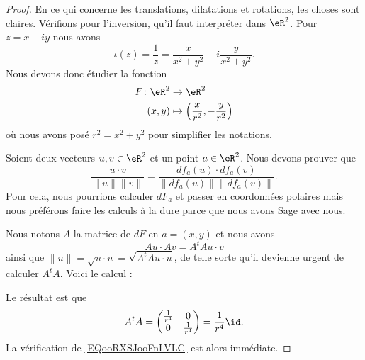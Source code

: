 \begin{proof}
    En ce qui concerne les translations, dilatations et rotations, les choses sont claires. Vérifions pour l'inversion, qu'il faut interpréter dans \( \eR^2\). Pour \( z=x+iy\) nous avons
    \begin{equation}
        \iota(z)=\frac{1}{ z }=\frac{ x }{ x^2+y^2 }-i\frac{ y }{ x^2+y^2 }.
    \end{equation}
    Nous devons donc étudier la fonction
    \begin{equation}
        \begin{aligned}
            F\colon \eR^2&\to \eR^2 \\
            (x,y)&\mapsto \left( \frac{ x }{ r^2 },-\frac{ y }{ r^2 } \right) 
        \end{aligned}
    \end{equation}
    où nous avons posé \( r^2=x^2+y^2\) pour simplifier les notations.

    Soient deux vecteurs \( u,v\in \eR^2\) et un point \( a\in \eR^2\). Nous devons prouver que
    \begin{equation}        \label{EQooRXSJooFnLVLC}
        \frac{ u\cdot v }{ \| u \|\| v \| }=\frac{ df_a(u)\cdot df_a(v)  }{ \| df_a(u) \|\| df_a(v) \| }.
    \end{equation}
    Pour cela, nous pourrions calculer \( dF_a\) et passer en coordonnées polaires\cite{ooDTHEooBAnkGP} mais nous préférons faire les calculs à la dure parce que nous avons Sage avec nous.

    Nous notons \( A\) la matrice de \( dF\) en \( a=(x,y)\) et nous avons
    \begin{equation}
        Au\cdot Av=A^tAu\cdot v
    \end{equation}
    ainsi que \( \| u \|=\sqrt{ u\cdot u }=\sqrt{ A^tAu\cdot u }\), de telle sorte qu'il devienne urgent de calculer \( A^tA\). Voici le calcul :

    

    Le résultat est que
    \begin{equation}
        A^tA=\begin{pmatrix}
            \frac{1}{ r^4 }    &   0    \\ 
            0    &   \frac{1}{ r^4 }    
        \end{pmatrix}=\frac{1}{ r^4 }\id.
    \end{equation}
    La vérification de \eqref{EQooRXSJooFnLVLC} est alors immédiate.
\end{proof}

